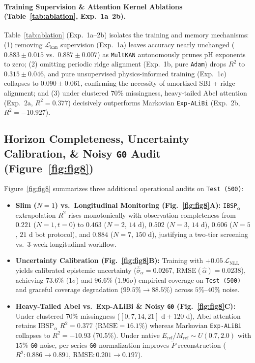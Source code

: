 \documentclass[10pt,twocolumn,a4paper]{article}
\begin{document}
\paragraph{Training Supervision \& Attention Kernel Ablations (Table~\ref{tab:ablation}, Exp.~1a--2b).}
Table~\ref{tab:ablation} (Exp.~1a--2b) isolates the training and memory mechanisms: (1) removing $\mathcal{L}_{\text{kan}}$ supervision (Exp.~1a) leaves accuracy nearly unchanged ($0.883 \pm 0.015$ vs.\ $0.887 \pm 0.007$) as \texttt{MultKAN} autonomously prunes pH exponents to zero; (2) omitting periodic ridge alignment (Exp.~1b, pure \texttt{Adam}) drops $R^2$ to $0.315 \pm 0.046$, and pure unsupervised physics-informed training (Exp.~1c) collapses to $0.090 \pm 0.061$, confirming the necessity of amortized SBI + ridge alignment; and (3) under clustered $70\%$ missingness, heavy-tailed Abel attention (Exp.~2a, $R^2 = 0.377$) decisively outperforms Markovian \texttt{Exp-ALiBi} (Exp.~2b, $R^2 = -10.927$).

\subsection{Horizon Completeness, Uncertainty Calibration, \& Noisy \texttt{G0} Audit (Figure~\ref{fig:fig8})}

Figure~\ref{fig:fig8} summarizes three additional operational audits on \texttt{Test (500)}:
\begin{itemize}\setlength{\itemsep}{1pt}\setlength{\parskip}{0pt}
  \item \textbf{Slim ($N=1$) vs.\ Longitudinal Monitoring (Fig.~\ref{fig:fig8}A):} \texttt{IBSP}$_\alpha$ extrapolation $R^2$ rises monotonically with observation completeness from $0.221$ ($N=1, t=0$) to $0.463$ ($N=2$, $14\text{ d}$), $0.502$ ($N=3$, $14\text{ d}$), $0.606$ ($N=5$, $21\text{ d}$ bot protocol), and $0.884$ ($N=7$, $150\text{ d}$), justifying a two-tier screening vs.\ 3-week longitudinal workflow.
  \item \textbf{Uncertainty Calibration (Fig.~\ref{fig:fig8}B):} Training with $+0.05\,\mathcal{L}_{\text{NLL}}$ yields calibrated epistemic uncertainty ($\bar{\hat{\sigma}}_\alpha = 0.0267$, $\text{RMSE}(\hat{\alpha}) = 0.0238$), achieving $73.6\%$ ($1\sigma$) and $96.6\%$ ($1.96\sigma$) empirical coverage on \texttt{Test (500)} and graceful coverage degradation ($99.5\% \to 88.5\%$) across $5\%\text{--}40\%$ noise.
  \item \textbf{Heavy-Tailed Abel vs.\ Exp-ALiBi \& Noisy \texttt{G0} (Fig.~\ref{fig:fig8}C):} Under clustered $70\%$ missingness ($[0,7,14,21]\text{ d} + 120\text{ d}$), Abel attention retains $\text{IBSP}_\alpha$ $R^2 = 0.377$ ($\text{RMSE}=16.1\%$) whereas Markovian \texttt{Exp-ALiBi} collapses to $R^2 = -10.93$ ($70.5\%$). Under native $E_{\text{ref}}/M_{\text{ref}} \sim U(0.7, 2.0)$ with $15\%$ \texttt{G0} noise, per-series \texttt{G0} normalization improves $\tilde{P}$ reconstruction ($R^2: 0.886 \to 0.891$, $\text{RMSE}: 0.201 \to 0.197$).
\end{itemize}
\end{document}
